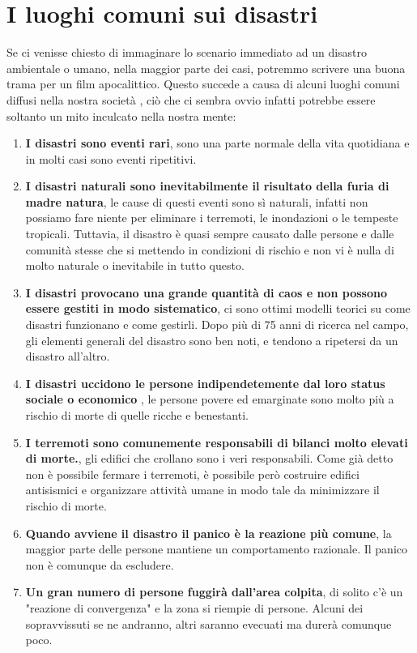\section{I luoghi comuni sui disastri}
Se ci venisse chiesto di immaginare lo scenario immediato ad un disastro ambientale o umano, nella maggior parte dei casi, potremmo scrivere una buona trama per un film apocalittico. Questo succede a causa di alcuni luoghi comuni diffusi nella nostra società \cite{COMMON}, ciò che ci sembra ovvio infatti potrebbe essere soltanto un mito inculcato nella nostra mente:
\begin{enumerate}
\item\textbf{ I disastri sono eventi rari}, sono una parte normale della vita quotidiana e in molti casi sono eventi ripetitivi.
\item\textbf{ I disastri naturali sono inevitabilmente il risultato della furia di madre natura}, le cause di questi eventi sono sì naturali, infatti non possiamo fare niente per eliminare i terremoti, le inondazioni o le tempeste tropicali. Tuttavia, il disastro è quasi sempre causato dalle persone e dalle comunità stesse che si mettendo in condizioni di rischio e non vi è nulla di molto naturale o inevitabile in tutto questo. 
\item\textbf{ I disastri provocano una grande quantità di caos e non possono essere gestiti in modo sistematico}, ci sono ottimi modelli teorici su come disastri funzionano e come gestirli. Dopo più di 75 anni di ricerca nel campo, gli elementi generali del disastro sono ben noti, e tendono a ripetersi da un disastro all'altro.
\item\textbf{ I disastri uccidono le persone indipendetemente dal loro status sociale o economico }, le persone povere ed emarginate sono molto più a rischio di morte di quelle ricche e benestanti.
\item\textbf{ I terremoti sono comunemente responsabili di bilanci molto elevati di morte.}, gli edifici che crollano sono i veri responsabili. Come già detto non è possibile fermare i terremoti, è possibile però costruire edifici antisismici e organizzare attività umane in modo tale da minimizzare il rischio di morte.
\item\textbf{Quando avviene il disastro il panico è la reazione più comune}, la maggior parte delle persone mantiene un comportamento razionale. Il panico non è comunque da escludere.
\item\textbf{Un gran numero di persone fuggirà dall'area colpita}, di solito c'è un "reazione di convergenza" e la zona si riempie di persone. Alcuni dei sopravvissuti se ne andranno, altri saranno evecuati ma durerà comunque poco.

\end{enumerate}
